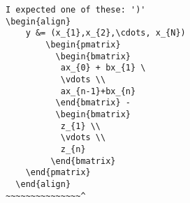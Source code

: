 \begin{verbatim}
I expected one of these: ')'
\begin{align}
    y &= (x_{1},x_{2},\cdots, x_{N})
        \begin{pmatrix}
          \begin{bmatrix}
           ax_{0} + bx_{1} \           
           \vdots \\
           ax_{n-1}+bx_{n}
          \end{bmatrix} -
          \begin{bmatrix}
           z_{1} \\
           \vdots \\
           z_{n}
         \end{bmatrix}
    \end{pmatrix}
  \end{align}
~~~~~~~~~~~~~~~^
\end{verbatim}
